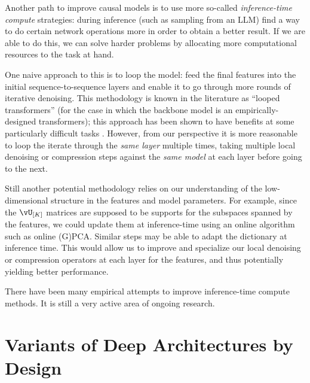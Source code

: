 \documentclass[../../book-main.tex]{subfiles}
\begin{document}
\begin{example}
    Another path to improve causal models is to use more so-called \textit{inference-time compute} strategies: during inference (such as sampling from an LLM) find a way to do certain network operations more in order to obtain a better result. If we are able to do this, we can solve harder problems by allocating more computational resources to the task at hand.

    One naive approach to this is to loop the model: feed the final features into the initial sequence-to-sequence layers and enable it to go through more rounds of iterative denoising. This methodology is known in the literature as ``looped transformers'' (for the case in which the backbone model is an empirically-designed transformers); this approach has been shown to have benefits at some particularly difficult tasks \citep{giannou2023looped,yang2023looped,saunshi2025reasoning}. However, from our perspective it is more reasonable to loop the iterate through the \textit{same layer} multiple times, taking multiple local denoising or compression steps against the \textit{same model} at each layer before going to the next.

    Still another potential methodology relies on our understanding of the low-dimensional structure in the features and model parameters. For example, since the \(\vU_{[K]}\) matrices are supposed to be supports for the subspaces spanned by the features, we could update them at inference-time using an online algorithm such as online (G)PCA. Similar steps may be able to adapt the dictionary at inference time. This would allow us to improve and specialize our local denoising or compression operators at each layer for the features, and thus potentially yielding better performance.

    There have been many empirical attempts to improve inference-time compute methods. It is still a very active area of ongoing research. 
\end{example}



\section{Variants of Deep Architectures by Design} \label{sec:chap4-derive-white-box-transformer-variants}
\end{document}
